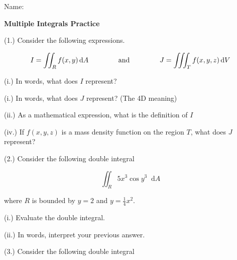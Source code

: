 \documentclass[11pt]{article}
\newcommand*\dif{\mathop{}\!\mathrm{d}}
\begin{document}
Name: \underline{\hspace{10cm}}

\begin{center}
\begin{huge}\bf Multiple Integrals Practice 
\end{huge}
\end{center}

(1.) Consider the following expressions.

\begin{equation}
    I = \iint_R f(x,y) \dif{A} \hspace{1.5cm} \text{and} \hspace{1.5cm} J = \iiint_T f(x,y,z) \dif{V} 
\end{equation}



(i.) In words, what does $I$ represent?



\vspace{3cm}


(i.) In words, what does $J$ represent? (The 4D meaning)



\vspace{3cm}

(ii.) As a mathematical expression, what is the definition of $I$


\vspace{3cm}



(iv.) If $f(x,y,z)$ is a mass density function on the region $T$, what does $J$ represent?


\newpage

(2.) Consider the following double integral

\begin{equation}
    \iint_R 5x^3 \cos{y^3} \dif{A}
\end{equation}



where $R$ is bounded by $y=2$ and $y= \frac{1}{4}x^2$.

\vspace{.5cm}

(i.) Evaluate the double integral. 

\vspace{12cm}

(ii.) In words, interpret your previous answer.


\newpage

(3.) Consider the following double integral
\end{document}
